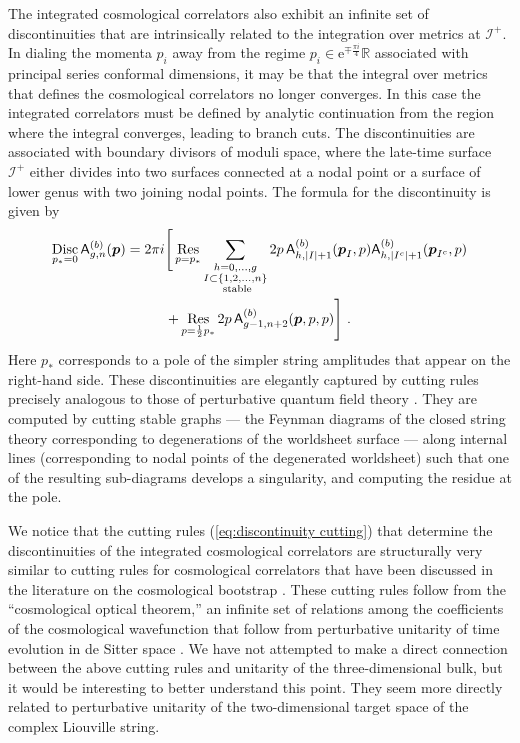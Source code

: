 \documentclass[12pt,a4paper]{article}
\newcommand\Res{\mathop{\text{Res}}}
\DeclareMathOperator*\Disc{Disc}
\begin{document}
The integrated cosmological correlators also exhibit an infinite set of discontinuities that are intrinsically related to the integration over metrics at $\mathcal{I}^+$. In dialing the momenta $p_i$ away from the regime $p_i \in \mathrm{e}^{\mp\frac{\pi i}{4}}\mathbb{R}$ associated with principal series conformal dimensions, it may be that the integral over metrics that defines the cosmological correlators no longer converges. In this case the integrated correlators must be defined by analytic continuation from the region where the integral converges, leading to branch cuts. The discontinuities are associated with boundary divisors of moduli space, where the late-time surface $\mathcal{I}^+$ either divides into two surfaces connected at a nodal point or a surface of lower genus with two joining nodal points. The formula for the discontinuity is given by \cite{paper1}
\begin{multline} 
\Disc_{p_*=0} \mathsf{A}_{g,n}^{(b)}(\boldsymbol{p})=2\pi i \Bigg[\Res_{p=p_*} \sum_{\begin{subarray}{c} 
h=0,\dots,g \\ 
I \subset \{1,2,\dots,n\} \\ \text{ stable}
\end{subarray}} 2p\, \mathsf{A}^{(b)}_{h,|I|+1}(\boldsymbol{p}_I,p)\mathsf{A}^{(b)}_{h,|I^c|+1}(\boldsymbol{p}_{I^c},p)\\
+\Res_{p=\frac{1}{2}p_*}2p\,  \mathsf{A}^{(b)}_{g-1,n+2}(\boldsymbol{p},p,p)\Bigg]~.\label{eq:discontinuity cutting}
\end{multline}
Here $p_*$ corresponds to a pole of the simpler string amplitudes that appear on the right-hand side. These discontinuities are elegantly captured by cutting rules precisely analogous to those of perturbative quantum field theory \cite{paper2}. They are computed by cutting stable graphs --- the Feynman diagrams of the closed string theory corresponding to degenerations of the worldsheet surface --- along internal lines (corresponding to nodal points of the degenerated worldsheet) such that one of the resulting sub-diagrams develops a singularity, and computing the residue at the pole.

We notice that the cutting rules (\ref{eq:discontinuity cutting}) that determine the discontinuities of the integrated cosmological correlators are structurally very similar to cutting rules for cosmological correlators that have been discussed in the literature on the cosmological bootstrap \cite{Baumann:2021fxj,Melville:2021lst,Goodhew:2021oqg}. These cutting rules follow from the ``cosmological optical theorem,'' an infinite set of relations among the coefficients of the cosmological wavefunction that follow from perturbative unitarity of time evolution in de Sitter space \cite{Goodhew:2020hob}. We have not attempted to make a direct connection between the above cutting rules and unitarity of the three-dimensional bulk, but it would be interesting to better understand this point. They seem more directly related to perturbative unitarity of the two-dimensional target space of the complex Liouville string. 
\end{document}
